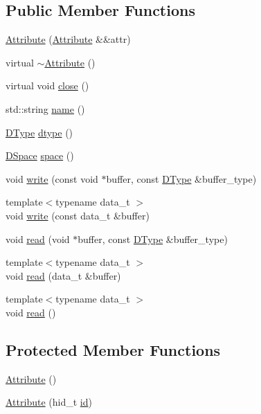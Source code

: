\subsection*{Public Member Functions}
\begin{DoxyCompactItemize}
\item 
\hyperlink{class_h5_t_l_1_1_attribute_af0918ea5d8b3ee3eace2b4b70de083da}{Attribute} (\hyperlink{class_h5_t_l_1_1_attribute}{Attribute} \&\&attr)
\item 
virtual \hyperlink{class_h5_t_l_1_1_attribute_a6d651fbe37b2311c62deed182d1d2371}{$\sim$\-Attribute} ()
\item 
virtual void \hyperlink{class_h5_t_l_1_1_attribute_a813d411fb240af759bc6f38f8b64aede}{close} ()
\item 
std\-::string \hyperlink{class_h5_t_l_1_1_attribute_a52de6c303533cc5f76ed4e158332da49}{name} ()
\item 
\hyperlink{class_h5_t_l_1_1_d_type}{D\-Type} \hyperlink{class_h5_t_l_1_1_attribute_a976384a5498eca27eeb00d20031ac6b0}{dtype} ()
\item 
\hyperlink{class_h5_t_l_1_1_d_space}{D\-Space} \hyperlink{class_h5_t_l_1_1_attribute_ad8ce0c28ab0d1c442a5ed668b3bcb62a}{space} ()
\item 
void \hyperlink{class_h5_t_l_1_1_attribute_a14e297e1930afdcb1e6f4fd446587b72}{write} (const void $\ast$buffer, const \hyperlink{class_h5_t_l_1_1_d_type}{D\-Type} \&buffer\-\_\-type)
\item 
{\footnotesize template$<$typename data\-\_\-t $>$ }\\void \hyperlink{class_h5_t_l_1_1_attribute_a32ac6a40d8cbefb6b4b6cd069dcc919f}{write} (const data\-\_\-t \&buffer)
\item 
void \hyperlink{class_h5_t_l_1_1_attribute_aebc7274e4e3313000fdefac4aa2e18c3}{read} (void $\ast$buffer, const \hyperlink{class_h5_t_l_1_1_d_type}{D\-Type} \&buffer\-\_\-type)
\item 
{\footnotesize template$<$typename data\-\_\-t $>$ }\\void \hyperlink{class_h5_t_l_1_1_attribute_a16fd54489901878488beb8fd75be846f}{read} (data\-\_\-t \&buffer)
\item 
{\footnotesize template$<$typename data\-\_\-t $>$ }\\void \hyperlink{class_h5_t_l_1_1_attribute_ab468364f2302366ca16e53edfbdfef21}{read} ()
\end{DoxyCompactItemize}
\subsection*{Protected Member Functions}
\begin{DoxyCompactItemize}
\item 
\hyperlink{class_h5_t_l_1_1_attribute_a6429348b75c240ee43281d76fe523ba4}{Attribute} ()
\item 
\hyperlink{class_h5_t_l_1_1_attribute_a7b476eaa2bdc241d05ae5d57861e3cb0}{Attribute} (hid\-\_\-t \hyperlink{class_h5_t_l_1_1_i_d_ade483b65e8a77310b025e86b11cbc38c}{id})
\end{DoxyCompactItemize}
